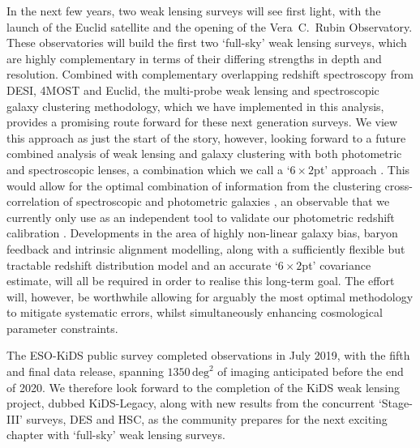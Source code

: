In the next few years, two weak lensing surveys will see first light, with the launch of the Euclid satellite and the opening of the Vera~C.~Rubin Observatory.   These observatories will build the first two `full-sky' weak lensing surveys, which are highly complementary in terms of their differing strengths in depth and resolution.  Combined with complementary overlapping redshift spectroscopy from DESI, 4MOST and Euclid, the multi-probe weak lensing and spectroscopic galaxy clustering methodology, which we have implemented in this analysis, provides a promising route forward for these next generation surveys.   We view this \tttp approach as just the start of the story, however, looking forward to a future combined analysis of weak lensing and galaxy clustering with both photometric and spectroscopic lenses, a combination which we call a `$6\times2$pt' approach \citep{bernstein:2009}.    This would allow for the optimal combination of information from the clustering cross-correlation of spectroscopic and photometric galaxies \citep{newman:2008}, an observable that we currently only use as an independent tool to validate our photometric redshift calibration \citep{hildebrandt/etal:inprep}.      Developments in the area of highly non-linear galaxy bias, baryon feedback and intrinsic alignment modelling, along with a sufficiently flexible but tractable redshift distribution model and an accurate `$6\times2$pt' covariance estimate, will all be required in order to realise this long-term goal.   The effort will, however, be worthwhile allowing for arguably the most optimal methodology to mitigate systematic errors, whilst simultaneously enhancing cosmological parameter constraints.

The ESO-KiDS public survey completed observations in July 2019, with the fifth and final data release, spanning $1350\,\mathrm{deg}^{2}$ of imaging anticipated before the end of 2020.  We therefore look forward to the completion of the KiDS weak lensing project, dubbed KiDS-Legacy, along with new results from the concurrent `Stage-III' surveys, DES and HSC, as the community prepares for the next exciting chapter with `full-sky' weak lensing surveys.  